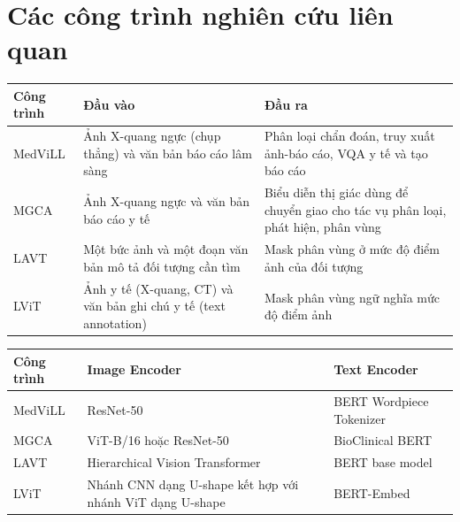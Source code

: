 \section{Các công trình nghiên cứu liên quan}

\begin{frame}{\secname}
    \begin{table}
        \begin{tabular}{p{2cm}|p{4cm}|p{4cm}}
            \toprule
            Công trình & Đầu vào & Đầu ra \\
            \midrule
            \cite{moon_multi-modal_2021} MedViLL & Ảnh X-quang ngực (chụp thẳng) và văn bản báo cáo lâm sàng & Phân loại chẩn đoán, truy xuất ảnh-báo cáo, VQA y tế và tạo báo cáo \\
            \cite{wang_multi-granularity_2022} MGCA & Ảnh X-quang ngực và văn bản báo cáo y tế & Biểu diễn thị giác dùng để chuyển giao cho tác vụ phân loại, phát hiện, phân vùng \\
            \cite{yang_lavt_2021} LAVT & Một bức ảnh và một đoạn văn bản mô tả đối tượng cần tìm & Mask phân vùng ở mức độ điểm ảnh của đối tượng \\
            \cite{li_lvit_2023} LViT & Ảnh y tế (X-quang, CT) và văn bản ghi chú y tế (text annotation) & Mask phân vùng ngữ nghĩa mức độ điểm ảnh
        \end{tabular}
    \end{table}
\end{frame}

\begin{frame}{\secname}
    \begin{table}
        \begin{tabular}{p{2cm}|p{4cm}|p{4cm}}
            \toprule
            Công trình & Image Encoder & Text Encoder \\
            \midrule
            \cite{moon_multi-modal_2021} MedViLL & ResNet-50 & BERT Wordpiece Tokenizer \\
            \cite{wang_multi-granularity_2022} MGCA & ViT-B/16 hoặc ResNet-50 & BioClinical BERT \\
            \cite{yang_lavt_2021} LAVT & Hierarchical Vision Transformer & BERT base model \\
            \cite{li_lvit_2023} LViT & Nhánh CNN dạng U-shape kết hợp với nhánh ViT dạng U-shape & BERT-Embed
        \end{tabular}
    \end{table}
\end{frame}

